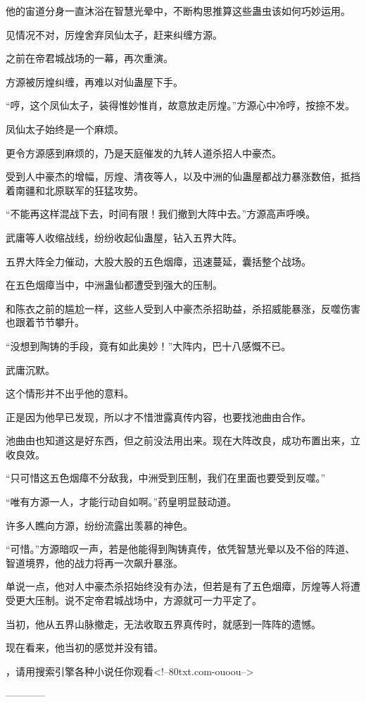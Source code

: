 \begin{this_body}
他的宙道分身一直沐浴在智慧光晕中，不断构思推算这些蛊虫该如何巧妙运用。

见情况不对，厉煌舍弃凤仙太子，赶来纠缠方源。

之前在帝君城战场的一幕，再次重演。

方源被厉煌纠缠，再难以对仙蛊屋下手。

“哼，这个凤仙太子，装得惟妙惟肖，故意放走厉煌。”方源心中冷哼，按捺不发。

凤仙太子始终是一个麻烦。

更令方源感到麻烦的，乃是天庭催发的九转人道杀招人中豪杰。

受到人中豪杰的增幅，厉煌、清夜等人，以及中洲的仙蛊屋都战力暴涨数倍，抵挡着南疆和北原联军的狂猛攻势。

“不能再这样混战下去，时间有限！我们撤到大阵中去。”方源高声呼唤。

武庸等人收缩战线，纷纷收起仙蛊屋，钻入五界大阵。

五界大阵全力催动，大股大股的五色烟瘴，迅速蔓延，囊括整个战场。

在五色烟瘴当中，中洲蛊仙都遭受到强大的压制。

和陈衣之前的尴尬一样，这些人受到人中豪杰杀招助益，杀招威能暴涨，反噬伤害也跟着节节攀升。

“没想到陶铸的手段，竟有如此奥妙！”大阵内，巴十八感慨不已。

武庸沉默。

这个情形并不出乎他的意料。

正是因为他早已发现，所以才不惜泄露真传内容，也要找池曲由合作。

池曲由也知道这是好东西，但之前没法用出来。现在大阵改良，成功布置出来，立收良效。

“只可惜这五色烟瘴不分敌我，中洲受到压制，我们在里面也要受到反噬。”

“唯有方源一人，才能行动自如啊。”药皇明显鼓动道。

许多人瞧向方源，纷纷流露出羡慕的神色。

“可惜。”方源暗叹一声，若是他能得到陶铸真传，依凭智慧光晕以及不俗的阵道、智道境界，他的战力将再一次飙升暴涨。

单说一点，他对人中豪杰杀招始终没有办法，但若是有了五色烟瘴，厉煌等人将遭受更大压制。说不定帝君城战场中，方源就可一力平定了。

当初，他从五界山脉撤走，无法收取五界真传时，就感到一阵阵的遗憾。

现在看来，他当初的感觉并没有错。

，请用搜索引擎各种小说任你观看<!--80txt.com-ouoou-->

------------

\end{this_body}


